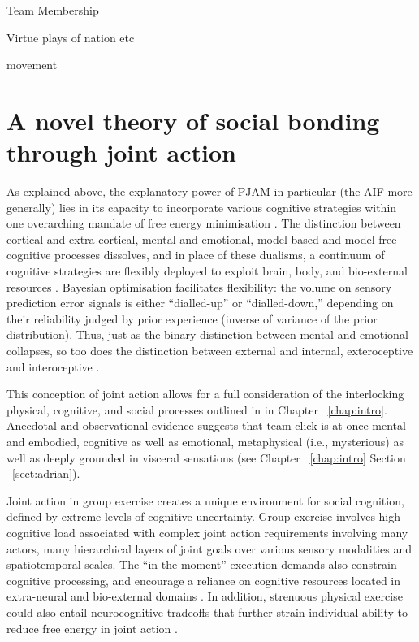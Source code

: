 \begin{CJK}{UTF8}{gbsn}
Team Membership

Virtue plays of nation etc

movement









\section{A novel theory of social bonding through joint action\label{sect:novelTheory}}

As explained above, the explanatory power of PJAM in particular (the AIF more generally) lies in its capacity to incorporate various cognitive strategies within one overarching mandate of free energy minimisation \citep{Clark2015}.  The distinction between cortical and extra-cortical, mental and emotional, model-based and model-free cognitive processes dissolves, and in place of these dualisms, a continuum of cognitive strategies are flexibly deployed to exploit brain, body, and bio-external resources \citep{Pezzulo2013}.  Bayesian optimisation facilitates flexibility: the volume on sensory prediction error signals is either ``dialled-up'' or ``dialled-down,'' depending on their reliability judged by prior experience (inverse of variance of the prior distribution). Thus, just as the binary distinction between mental and emotional collapses, so too does the distinction between external and internal, exteroceptive and interoceptive \citep[and proprioceptive][]{Seth2013}.

This conception of joint action allows for a full consideration of the interlocking physical, cognitive, and social processes outlined in in Chapter ~\ref{chap:intro}.   Anecdotal and observational evidence suggests that team click is at once mental and embodied, cognitive as well as emotional, metaphysical (i.e., mysterious) as well as deeply grounded in visceral sensations (see Chapter ~\ref{chap:intro} Section ~\ref{sect:adrian}).

Joint action in group exercise creates a unique environment for social cognition, defined by extreme levels of cognitive uncertainty.  Group exercise involves high cognitive load associated with complex joint action requirements involving many actors, many hierarchical layers of joint goals over various sensory modalities and spatiotemporal scales. The ``in the moment'' execution demands also constrain cognitive processing, and encourage a reliance on cognitive resources located in extra-neural and bio-external domains \citep{Bourbousson2016}.  In addition, strenuous physical exercise could also entail neurocognitive tradeoffs that further strain individual ability to reduce free energy in joint action \citep{Dietrich2004b}.



\end{CJK}
